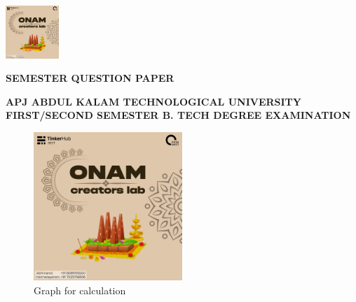 \documentclass[a4paper]{article}
\begin{document}
\begin{center}
  \includegraphics[height=2cm]{uploads/images/onam.jpg}
  \vspace{0.3cm}
  
  {\Large \textbf{SEMESTER QUESTION PAPER}}
\end{center}

\vspace{0.5cm}

\begin{center}
  {\large \textbf{APJ ABDUL KALAM TECHNOLOGICAL UNIVERSITY}}\\
  {\large \textbf{FIRST/SECOND SEMESTER B. TECH DEGREE EXAMINATION}}
\end{center}

\vspace{0.5cm}

\begin{center}
    \begin{figure}[h]
        \centering
        \includegraphics[width=0.5\textwidth]{uploads/images/onam.jpg}
        \caption{Graph for calculation}
    \end{figure}
\end{center}
\end{document}
